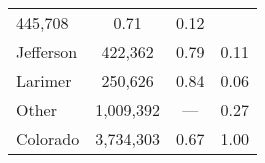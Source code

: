 \documentclass[]{article}
\begin{document}
\begin{longtable}[]{@{}lccc@{}}
\begin{minipage}[t]{0.24\columnwidth}
445,708\strut
\end{minipage} & \begin{minipage}[t]{0.29\columnwidth}\centering\strut
0.71\strut
\end{minipage} & \begin{minipage}[t]{0.25\columnwidth}\centering\strut
0.12\strut
\end{minipage}\tabularnewline
\begin{minipage}[t]{0.10\columnwidth}\raggedright\strut
Jefferson\strut
\end{minipage} & \begin{minipage}[t]{0.24\columnwidth}\centering\strut
422,362\strut
\end{minipage} & \begin{minipage}[t]{0.29\columnwidth}\centering\strut
0.79\strut
\end{minipage} & \begin{minipage}[t]{0.25\columnwidth}\centering\strut
0.11\strut
\end{minipage}\tabularnewline
\begin{minipage}[t]{0.10\columnwidth}\raggedright\strut
Larimer\strut
\end{minipage} & \begin{minipage}[t]{0.24\columnwidth}\centering\strut
250,626\strut
\end{minipage} & \begin{minipage}[t]{0.29\columnwidth}\centering\strut
0.84\strut
\end{minipage} & \begin{minipage}[t]{0.25\columnwidth}\centering\strut
0.06\strut
\end{minipage}\tabularnewline
\begin{minipage}[t]{0.10\columnwidth}\raggedright\strut
Other\strut
\end{minipage} & \begin{minipage}[t]{0.24\columnwidth}\centering\strut
1,009,392\strut
\end{minipage} & \begin{minipage}[t]{0.29\columnwidth}\centering\strut
---\strut
\end{minipage} & \begin{minipage}[t]{0.25\columnwidth}\centering\strut
0.27\strut
\end{minipage}\tabularnewline
\begin{minipage}[t]{0.10\columnwidth}\raggedright\strut
Colorado\strut
\end{minipage} & \begin{minipage}[t]{0.24\columnwidth}\centering\strut
3,734,303\strut
\end{minipage} & \begin{minipage}[t]{0.29\columnwidth}\centering\strut
0.67\strut
\end{minipage} & \begin{minipage}[t]{0.25\columnwidth}\centering\strut
1.00\strut
\end{minipage}\tabularnewline
\bottomrule
\end{longtable}
\end{document}
